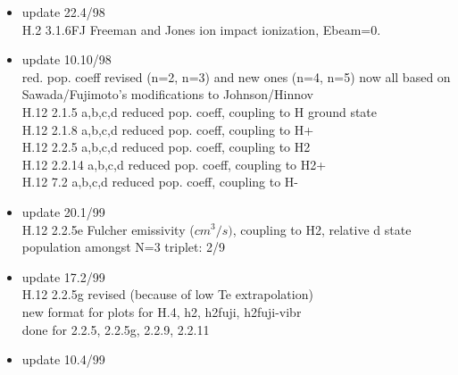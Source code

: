 \documentclass[12pt,dvipdfmx]{article}
\begin{document}
\begin{itemize}
  H.2 2.6B0 strahl carbon data ionization\\
  H.4 2.3.6B0 strahl carbon data recombination \\
  H.4 2.6A0 ADAS 93  carbon ionization    \\
  H.4 2.3.6A0 ADAS 93  carbon recombination \\
  H.10 2.6A0 ADAS 93  carbon line radiation plus 11.3 per ionization\\
                   (=electron cooling rate)\\
  H.10 2.3.6A0 ADAS 93  carbon line radiation due to recombination\\
                   (=electron cooling rate + 11.3 per ionisation)\\
  H.12 2.6A0 ADAS 93  carbon line radiation per ionization\\
  H.12 2.3.6A0 ADAS 93  carbon line radiation per recombination
 \item update   22.4/98 \\
  H.2  3.1.6FJ  Freeman and Jones ion impact ionization, Ebeam=0.
 \item update   10.10/98 \\
  red. pop. coeff revised (n=2, n=3) and new ones (n=4, n=5)
  now all based on Sawada/Fujimoto's modifications to Johnson/Hinnov\\
  H.12 2.1.5  a,b,c,d  reduced pop. coeff, coupling to H ground state\\
  H.12 2.1.8  a,b,c,d  reduced pop. coeff, coupling to H+\\
  H.12 2.2.5  a,b,c,d  reduced pop. coeff, coupling to H2\\
  H.12 2.2.14 a,b,c,d  reduced pop. coeff, coupling to H2+\\
  H.12 7.2    a,b,c,d  reduced pop. coeff, coupling to H-\\
 \item update   20.1/99 \\
  H.12 2.2.5e Fulcher emissivity ($cm^3/s)$, coupling to H2,
  relative d state population amongst N=3 triplet: 2/9\\
 \item update   17.2/99 \\
  H.12 2.2.5g revised (because of low Te extrapolation)\\
  new format for plots for H.4,  h2, h2fuji, h2fuji-vibr \\
  done for 2.2.5, 2.2.5g, 2.2.9, 2.2.11
 \item update   10.4/99 \\

\end{itemize}
\end{document}
